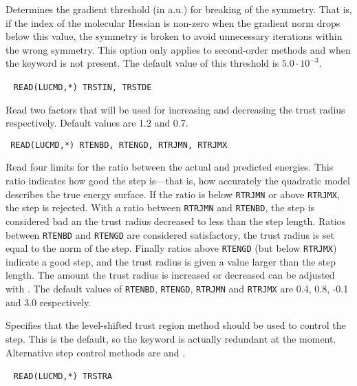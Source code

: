 \begin{description}
Determines the gradient threshold (in a.u.) for breaking of the
symmetry. That is, if the index of the
molecular Hessian is non-zero when the gradient norm
drops below this value, the symmetry is broken to avoid unnecessary
iterations within the wrong symmetry. This option only applies to
second-order methods and when the
keyword  is not present. The default value of this
threshold is $5.0\cdot 10^{-3}$.

\item[\Key{TR FAC}]\verb| |
\newline
\verb|READ(LUCMD,*) TRSTIN, TRSTDE|

Read two factors that will be used for increasing and decreasing the
trust radius respectively. Default values are
1.2 and 0.7.

\item[\Key{TR LIM}]\verb| |
\newline
\verb|READ(LUCMD,*) RTENBD, RTENGD, RTRJMN, RTRJMX|

Read four limits for the ratio between the actual and predicted
energies. This ratio indicates how good the step is---that is, how
accurately the quadratic model describes the true energy
surface. If the ratio is below \verb|RTRJMN| or above
\verb|RTRJMX|, the step is rejected. With a ratio between
\verb|RTRJMN| and \verb|RTENBD|, the step is considered bad an the
trust radius decreased to less than the step
length. Ratios between \verb|RTENBD| and \verb|RTENGD| are
considered satisfactory, the trust radius is set equal to the norm
of the step. Finally ratios above \verb|RTENGD| (but below
\verb|RTRJMX|) indicate a good step, and the trust radius is given
a value larger than the step length. The amount the trust radius
is increased or decreased can be adjusted with . The
default values of \verb|RTENBD|, \verb|RTENGD|, \verb|RTRJMN| and
\verb|RTRJMX| are 0.4, 0.8, -0.1 and 3.0 respectively.

\item[\Key{TRSTRG}]
Specifies that the level-shifted trust region method should be used to
control the step. This is the default, so the keyword is actually
redundant at the moment. Alternative step control methods are 
and .

\item[\Key{TRUSTR}]\verb| |
\newline
\verb|READ(LUCMD,*) TRSTRA|


\end{description}

